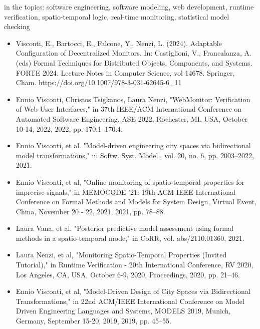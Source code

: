 \documentclass[10pt,a4paper,sans]{moderncv}        %
\begin{document}
{in the topics: software engineering, software modeling, web development, runtime verification, spatio-temporal logic, real-time monitoring, statistical model checking}{}{
\begin{itemize}
    \item Visconti, E., Bartocci, E., Falcone, Y., Nenzi, L. (2024). Adaptable Configuration of Decentralized Monitors. In: Castiglioni, V., Francalanza, A. (eds) Formal Techniques for Distributed Objects, Components, and Systems. FORTE 2024. Lecture Notes in Computer Science, vol 14678. Springer, Cham. https://doi.org/10.1007/978-3-031-62645-6\_11
    \item Ennio Visconti, Christos Tsigkanos, Laura Nenzi, "WebMonitor: Verification of Web User Interfaces," in 37th IEEE/ACM International Conference on Automated Software Engineering, ASE 2022, Rochester, MI, USA, October 10-14, 2022, 2022, pp. 170:1–170:4.
    \item Ennio Visconti, et al. "Model-driven engineering city spaces via bidirectional model transformations," in Softw. Syst. Model., vol. 20, no. 6, pp. 2003–2022, 2021.
    \item Ennio Visconti, et al, "Online monitoring of spatio-temporal properties for imprecise signals," in MEMOCODE '21: 19th ACM-IEEE International Conference on Formal Methods and Models for System Design, Virtual Event, China, November 20 - 22, 2021, 2021, pp. 78–88.
    \item Laura Vana, et al. "Posterior predictive model assessment using formal methods in a spatio-temporal mode," in CoRR, vol. abs/2110.01360, 2021.
    \item Laura Nenzi, et al, "Monitoring Spatio-Temporal Properties (Invited Tutorial)," in Runtime Verification - 20th International Conference, RV 2020, Los Angeles, CA, USA, October 6-9, 2020, Proceedings, 2020, pp. 21–46.
    \item Ennio Visconti, et al, "Model-Driven Design of City Spaces via Bidirectional Transformations," in 22nd ACM/IEEE International Conference on Model Driven Engineering Languages and Systems, MODELS 2019, Munich, Germany, September 15-20, 2019, 2019, pp. 45–55.
\end{itemize}
}


\clearpage

\end{document}
